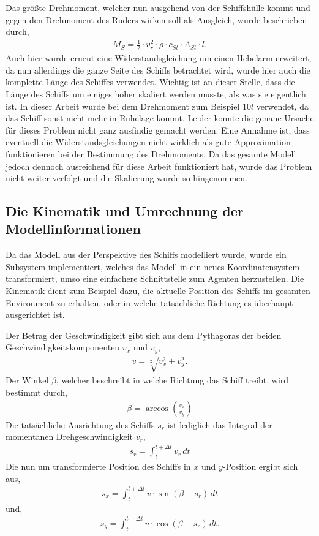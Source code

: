 \documentclass[]{iat}
\begin{document}
Das größte Drehmoment, welcher nun ausgehend von der Schiffshülle kommt und gegen den Drehmoment des Ruders wirken soll als Ausgleich, wurde beschrieben durch,
\begin{align}
    M_S = \frac{1}{2} \cdot v_r^2 \cdot \rho \cdot c_{St} \cdot A_{St} \cdot l.
\end{align}
Auch hier wurde erneut eine Widerstandsgleichung um einen Hebelarm erweitert, da nun allerdings die ganze Seite des Schiffs betrachtet wird, wurde hier auch die komplette Länge des Schiffes verwendet. Wichtig ist an dieser Stelle, dass die Länge des Schiffs um einiges höher skaliert werden musste, als was sie eigentlich ist. In dieser Arbeit wurde bei dem Drehmoment zum Beispiel $10l$ verwendet, da das Schiff sonst nicht mehr in Ruhelage kommt. Leider konnte die genaue Ursache für dieses Problem nicht ganz ausfindig gemacht werden. Eine Annahme ist, dass eventuell die Widerstandsgleichungen nicht wirklich als gute Approximation funktionieren bei der Bestimmung des Drehmoments. Da das gesamte Modell jedoch dennoch ausreichend für diese Arbeit funktioniert hat, wurde das Problem nicht weiter verfolgt und die Skalierung wurde so hingenommen.

\subsection{Die Kinematik und Umrechnung der Modellinformationen} \label{sec:kinematik}
Da das Modell aus der Perspektive des Schiffs modelliert wurde, wurde ein Subsystem implementiert, welches das Modell in ein neues Koordinatensystem transformiert, umso eine einfachere Schnittstelle zum Agenten herzustellen. Die Kinematik dient zum Beispiel dazu, die aktuelle Position des Schiffs im gesamten Environment zu erhalten, oder in welche tatsächliche Richtung es überhaupt ausgerichtet ist.

Der Betrag der Geschwindigkeit gibt sich aus dem Pythagoras der beiden Geschwindigkeitskomponenten $v_x$ und $v_y$,
\begin{align}
    v = \sqrt[2]{v_x^2 + v_y^2}.
\end{align}
Der Winkel $\beta$, welcher beschreibt in welche Richtung das Schiff treibt, wird bestimmt durch,
\begin{align}
    \beta = \arccos \left( \frac{v_x}{v_y} \right)
\end{align}
Die tatsächliche Ausrichtung des Schiffs $s_r$ ist lediglich das Integral der momentanen Drehgeschwindigkeit $v_r$,
\begin{align}
    s_r = \int_{t}^{t+\Delta t} v_r \, dt
\end{align}
Die nun um transformierte Position des Schiffs in $x$ und $y$-Position ergibt sich aus,
\begin{align}
    s_x = \int_{t}^{t+\Delta t} v \cdot \sin(\beta - s_r) \, dt
\end{align}
und,
\begin{align}
    s_y = \int_{t}^{t+\Delta t} v \cdot \cos(\beta - s_r) \, dt.
\end{align}
\end{document}
